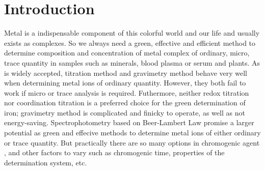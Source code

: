\ifx\SUM\undefined


\fi

\section{Introduction}

Metal is a indispensable component of this colorful world and our life and usually exists as complexes. So we always need a green, effective and efficient method to determine composition and concentration of metal complex of ordinary, micro, trace quantity in samples such as minerals, blood plasma or serum\cite{Ramsay1957The,Wong1923COLORIMETRIC} and plants\cite{Reis1994Multicommutation, Suo-YiHuang2004DeterminationofIron}. %
As is widely accepted, titration method and gravimetry method behave very well when determining metal ions of ordinary quantity. However, they both fail to work if micro or trace analysis is required. Futhermore, neither redox titration nor coordination titration is a preferred choice for the green determination of iron; gravimetry method is complicated and finicky to operate, as well as not energy-saving.
Spectrophotometry based on Beer-Lambert Law promise a larger potential as green and effecive methods to determine metal ions of either ordinary or trace quantity\cite{King1991Spectrophotometric,Carter1971Spectrophotometric,T1975Nitrosophenol}. But practically there are so many options in chromogenic agent \cite{Yoe1944Colorimetric,Stookey1970Ferrozine,Er-KunShang20134}, and other factors to vary such as chromogenic time, properties of the determination system, etc.

